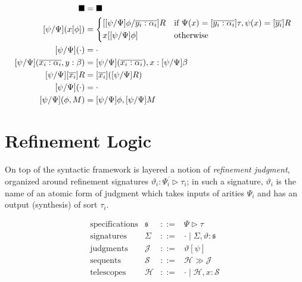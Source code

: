 \documentclass{article}
\renewcommand\vec[1]{\overline{#1}}
\newcommand\SORT{\blacksquare}
\newcommand\Ar[2]{[#1]#2}
\newcommand\TlNil{\cdot}
\newcommand\TlSnoc[3]{#1,#2:#3}
\newcommand\SpNil{\cdot}
\newcommand\SpSnoc[2]{#1,#2}
\newcommand\Ap[2]{#1[#2]}
\newcommand\Abs[2]{[#1]#2}
\newcommand\HSubst[3]{[#1/#2]#3}
\begin{document}
\begin{align*}
  \HSubst{\psi}{\Psi}{\SORT}
  &=
  \SORT
  \\
  \HSubst{\psi}{\Psi}{(\Ap{x}{\phi})}
  &=
  \begin{cases*}
    \HSubst{
      \HSubst{\psi}{\Psi}{\phi}
    }{\vec{y_i:\alpha_i}}{R} 
    &if $\Psi(x)=\Ar{\vec{y_i:\alpha_i}}{\tau}, \psi(x)=\Abs{\vec{y_i}}{R}$
    \\
    \Ap{x}{
      \HSubst{\psi}{\Psi}{\phi}
    }
    &otherwise
  \end{cases*}
  \\
  \HSubst{\psi}{\Psi}{(\TlNil)}
  &=
  \TlNil
  \\
  \HSubst{\psi}{\Psi}{(\TlSnoc{\vec{x_i:\alpha_i}}{y}{\beta})}
  &=
  \TlSnoc{
    \HSubst{\psi}{\Psi}{(\vec{x_i:\alpha_i})}
  }{x}{
    \HSubst{\psi}{\Psi}{\beta}
  }
  \\
  \HSubst{\psi}{\Psi}{\Abs{\vec{x_i}}{R}}
  &=
  \Abs{\vec{x_i}}{
    (\HSubst{\psi}{\Psi}{R})
  }
  \\
  \HSubst{\psi}{\Psi}{(\SpNil)}
  &=
  \SpNil
  \\
  \HSubst{\psi}{\Psi}{(\SpSnoc{\phi}{M})}
  &=
  \SpSnoc{\HSubst{\psi}{\Psi}{\phi}}{\HSubst{\psi}{\Psi}{M}}
\end{align*}

\section{Refinement Logic}

\newcommand\Spec[2]{{#1}\triangleright{#2}}
\newcommand\SigNil{\cdot}
\newcommand\SigSnoc[3]{#1,#2:#3}

\newcommand\Seq[2]{#1\gg{#2}}

\newcommand\RfSig[2]{{#1}\vdash{#2}\;\textit{sig}}
\newcommand\RfSpec[2]{{#1}\vdash{#2}\;\textit{spec}}
\newcommand\RfSrt[4]{#1\mathrel{\vdash_{#2}}{#3}\sqsubset{#4}}
\newcommand\RfAr[4]{#1\mathrel{\vdash_{#2}}{#3}\sqsubset{#4}}
\newcommand\RfTl[4]{#1\mathrel{\vdash_{#2}}{#3}\sqsubset{#4}}

On top of the syntactic framework is layered a notion of
\emph{refinement judgment}, organized around refinement signatures
$\vec{\vartheta_i:\Spec{\Psi_i}{\tau_i}}$; in such a signature,
$\vartheta_i$ is the name of an atomic form of judgment which takes
inputs of arities $\Psi_i$ and has an output (synthesis) of sort
$\tau_i$.

\[
  \begin{array}{llll}
    \text{specifications}
    &\mathfrak{s}
    &::=
    &\Spec{\Psi}{\tau}
    \\
    \text{signatures}
    &\Sigma
    &::=
    &\SigNil\mid\SigSnoc{\Sigma}{\vartheta}{\mathfrak{s}}
    \\
    \text{judgments}
    &\mathcal{J}
    &::=
    &\Ap{\vartheta}{\psi}
    \\
    \text{sequents}
    &\mathcal{S}
    &::=
    &\Seq{\mathcal{H}}{\mathcal{J}}
    \\
    \text{telescopes}
    &\mathcal{H}
    &::=
    &\TlNil\mid\TlSnoc{\mathcal{H}}{x}{\mathcal{S}}
  \end{array}
\]
\end{document}
